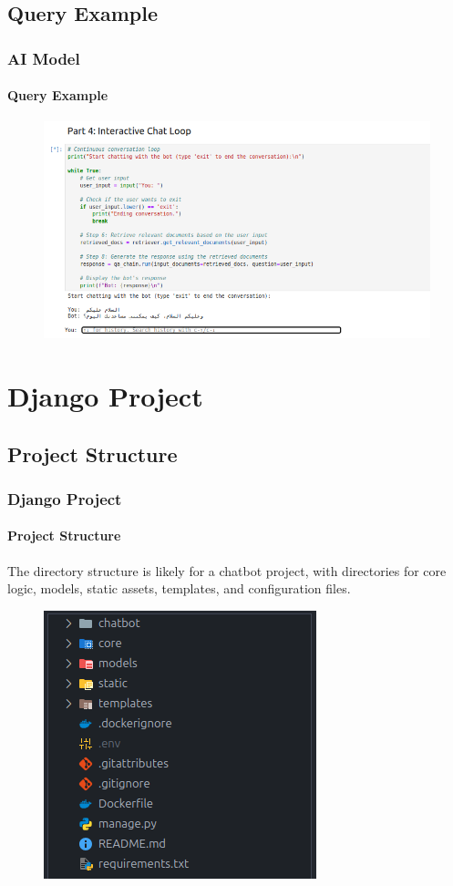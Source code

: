\documentclass[
	11pt, %
]{beamer}
\begin{document}
\subsection{Query Example}

\begin{frame}
	\frametitle{AI Model}
	\framesubtitle{Query Example}

	\begin{figure}
		\includegraphics[width=1\linewidth]{query_example.png}
	\end{figure}

\end{frame}


\section{Django Project}

\subsection{Project Structure}

\begin{frame}
	\frametitle{Django Project}
	\framesubtitle{Project Structure}
	
	The directory structure is likely for a chatbot project, with directories for core logic, models, static assets, templates, and configuration files.

	\begin{figure}
		\includegraphics[width=0.5\linewidth]{project_structure.png}
	\end{figure}

\end{frame}
\end{document}
